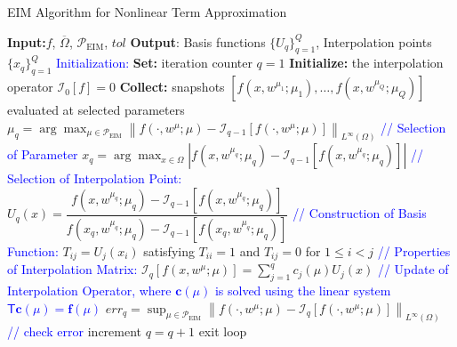 \documentclass[11pt]{article}
\renewcommand{\vec}[1]{\mathbf{#1}}
\newcommand{\mat}[1]{\mathsf{#1}}
\begin{document}
            \begin{algorithm}
                \caption{EIM Algorithm for Nonlinear Term Approximation}
                \begin{algorithmic}[1]
                    \STATE \textbf{Input:}$f$, $\overline{\Omega}$, $\mathcal{P}_{\text{EIM}}$, $tol$
                    \STATE \textbf{Output}: Basis functions $\{ U_q \}_{q=1}^Q$, Interpolation points $\{ x_q \}_{q=1}^Q$
                    \STATE \textcolor{blue}{Initialization:}
                    \STATE \textbf{Set:} iteration counter $q = 1$
                    \STATE \textbf{Initialize:} the interpolation operator $\mathcal{I}_0[f] = 0$
                    \STATE \textbf{Collect:} snapshots $[f(x, w^{\mu_1}; \mu_1), \ldots, f(x, w^{\mu_Q}; \mu_Q)]$ evaluated at selected parameters
                        \STATE $ \mu_q = \arg \max_{\mu \in \mathcal{P}_{\text{EIM}}} \left\| f(\cdot, w^\mu; \mu) - \mathcal{I}_{q-1}[ f(\cdot, w^\mu; \mu) ] \right\|_{L^\infty(\Omega)} $ \textcolor{blue}{// Selection of Parameter}\vspace{6pt}
                        \STATE $ x_q = \arg \max_{x \in \Omega} \left| f(x, w^{\mu_q}; \mu_q) - \mathcal{I}_{q-1}[ f(x, w^{\mu_q}; \mu_q) ] \right| $ \textcolor{blue}{// Selection of Interpolation Point:}\vspace{6pt}
                        \STATE $ U_q(x) = \dfrac{ f(x, w^{\mu_q}; \mu_q) - \mathcal{I}_{q-1}[ f(x, w^{\mu_q}; \mu_q) ] }{ f(x_q, w^{\mu_q}; \mu_q) - \mathcal{I}_{q-1}[ f(x_q, w^{\mu_q}; \mu_q) ] } $ \textcolor{blue}{// Construction of Basis Function:}\vspace{6pt}
                        \STATE $T_{ij} = U_j(x_i)$ satisfying $T_{ii} = 1$ and $T_{ij} = 0$ for $1 \leq i < j$ \textcolor{blue}{// Properties of Interpolation Matrix:}\vspace{6pt}
                        \STATE $   \mathcal{I}_q[ f(x, w^{\mu}; \mu) ] = \sum_{j=1}^q c_j(\mu) U_j(x) $ \textcolor{blue}{// Update of Interpolation Operator, where $\vec{c}(\mu)$ is solved using the linear system $\mat{T} \vec{c}(\mu) = \vec{f}(\mu)$}\vspace{6pt}
                        \STATE $ err_q = \sup_{\mu \in \mathcal{P}_{\text{EIM}}} \left\| f(\cdot, w^\mu; \mu) - \mathcal{I}_q[ f(\cdot, w^\mu; \mu) ] \right\|_{L^\infty(\Omega)}$  \textcolor{blue}{// check error}\vspace{6pt}
                            \STATE increment $q = q + 1$
                        \ELSE
                            \STATE exit loop
                        \ENDIF
                    \ENDWHILE
                \end{algorithmic}
            \end{algorithm}
\end{document}
